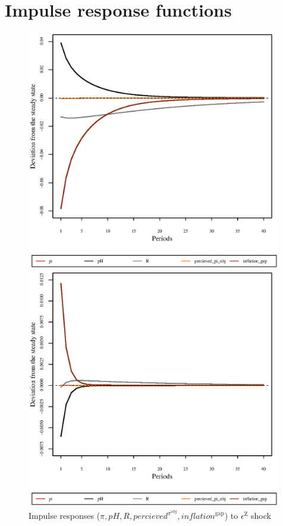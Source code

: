 \pagebreak

\section{Impulse response functions}

\begin{figure}[h]
\begin{minipage}{0.5\textwidth}
\vspace*{-3em}
\centering
\includegraphics[width=0.99\textwidth, scale=0.55]{plots/plot_131.eps}
\caption{Impulse responses ($\pi, {p\!H}, R, {p\!e\!r\!c\!i\!e\!v\!e\!d}^{\pi^{\mathrm{obj}}}, {i\!n\!f\!l\!a\!t\!i\!o\!n}^{\mathrm{gap}}$) to $\epsilon^{\mathrm{Z}}$ shock}
\end{minipage}
\begin{minipage}{0.5\textwidth}
\vspace*{-3em}
\centering
\includegraphics[width=0.99\textwidth, scale=0.55]{plots/plot_132.eps}

\end{minipage}
\end{figure}
